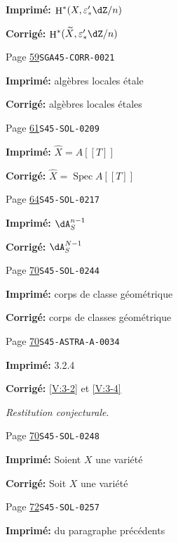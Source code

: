 \documentclass[oneside]{book}
\providecommand\llbracket{[\! [}%
\providecommand\rrbracket{]\! ]}}
\DeclareMathOperator{\h}{H}
\DeclareMathOperator{\spec}{Spec}
\theoremstyle{sga-source}
\theoremstyle{sga-source-dash}
\theoremstyle{sga-source-dotdash}
\theoremstyle{sga-source-number-note-dash}
\theoremstyle{sga-source-note-number-dotdash}
\theoremstyle{sga-source-example-dotdash}
\theoremstyle{sga-source-inline-number}
\theoremstyle{sga-source-bare-number}
\theoremstyle{sga-source}
\begin{document}
\begin{description}
\par\noindent\textbf{Imprimé:} \(\h^*(X,\varepsilon_*' \dZ/n)\)
\par\noindent\textbf{Corrigé:} \(\h^*(\widetilde X,\varepsilon_*' \dZ/n)\)
\smallskip
\item[\hypertarget{apparatus:FR-0025}{25}] Page \hyperlink{printpage:fr:59}{59}\quad\texttt{SGA45-CORR-0021}
\par\noindent\textbf{Imprimé:} algèbres locales étale
\par\noindent\textbf{Corrigé:} algèbres locales étales
\smallskip
\item[\hypertarget{apparatus:FR-0026}{26}] Page \hyperlink{printpage:fr:61}{61}\quad\texttt{S45-SOL-0209}
\par\noindent\textbf{Imprimé:} \(\widehat X=A\llbracket T\rrbracket\)
\par\noindent\textbf{Corrigé:} \(\widehat X=\spec A\llbracket T\rrbracket\)
\smallskip
\item[\hypertarget{apparatus:FR-0027}{27}] Page \hyperlink{printpage:fr:64}{64}\quad\texttt{S45-SOL-0217}
\par\noindent\textbf{Imprimé:} \(\dA_S^{n-1}\)
\par\noindent\textbf{Corrigé:} \(\dA_S^{N-1}\)
\smallskip
\item[\hypertarget{apparatus:FR-0028}{28}] Page \hyperlink{printpage:fr:70}{70}\quad\texttt{S45-SOL-0244}
\par\noindent\textbf{Imprimé:} corps de classe géométrique
\par\noindent\textbf{Corrigé:} corps de classes géométrique
\smallskip
\item[\hypertarget{apparatus:FR-0029}{29}] Page \hyperlink{printpage:fr:70}{70}\quad\texttt{S45-ASTRA-A-0034}
\par\noindent\textbf{Imprimé:} 3.2.4
\par\noindent\textbf{Corrigé:} \ref{V:3-2} et \ref{V:3-4}
\par\noindent\emph{Restitution conjecturale}.
\smallskip
\item[\hypertarget{apparatus:FR-0030}{30}] Page \hyperlink{printpage:fr:70}{70}\quad\texttt{S45-SOL-0248}
\par\noindent\textbf{Imprimé:} Soient $X$ une variété
\par\noindent\textbf{Corrigé:} Soit $X$ une variété
\smallskip
\item[\hypertarget{apparatus:FR-0031}{31}] Page \hyperlink{printpage:fr:72}{72}\quad\texttt{S45-SOL-0257}
\par\noindent\textbf{Imprimé:} du paragraphe précédents

\end{description}
\end{document}
